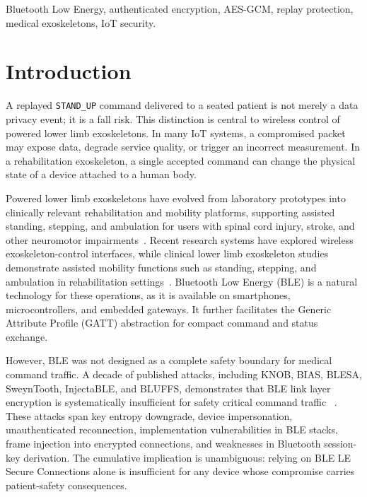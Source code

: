 \documentclass[journal]{IEEEtran}
\begin{document}
\begin{IEEEkeywords}
Bluetooth Low Energy, authenticated encryption, AES-GCM, replay protection,
medical exoskeletons, IoT security.
\end{IEEEkeywords}

\IEEEpeerreviewmaketitle


\section{Introduction}
\label{sec:intro}

A replayed \texttt{STAND\_UP} command delivered to a seated patient is not merely a data privacy event; it is a fall risk. This distinction is central to wireless control of powered lower limb exoskeletons. In many IoT systems, a compromised packet may expose data, degrade service quality, or trigger an incorrect measurement. In a rehabilitation exoskeleton, a single accepted command can change the physical state of a device attached to a human body.

Powered lower limb exoskeletons have evolved from laboratory prototypes into clinically relevant rehabilitation and mobility platforms, supporting assisted standing, stepping, and ambulation for users with spinal cord injury, stroke, and other neuromotor impairments~\cite{baud2021review,pinto2020performance}.
Recent research systems have explored wireless exoskeleton-control interfaces, while clinical lower limb exoskeleton studies demonstrate assisted mobility functions such as standing, stepping, and ambulation in rehabilitation settings~\cite{andersson2024wireless,atlas2030_2022}.
Bluetooth Low Energy (BLE) is a natural technology for these operations, as it is available on smartphones, microcontrollers, and embedded gateways. It further facilitates the Generic Attribute Profile (GATT) abstraction for compact command and status exchange.

However, BLE was not designed as a complete safety boundary for medical command traffic. A decade of published attacks, including KNOB, BIAS, BLESA, SweynTooth, InjectaBLE, and BLUFFS, demonstrates that BLE link layer encryption is systematically insufficient for safety critical command traffic
~\cite{antonioli2020knob,antonioli2020bias,wu2020blesa,garbelini2020sweyntooth,
cayre2021injectable,antonioli2023bluffs}. 
These attacks span key entropy downgrade, device impersonation, unauthenticated reconnection, implementation vulnerabilities in BLE stacks, frame injection into encrypted connections, and weaknesses in Bluetooth session-key derivation. The cumulative implication is unambiguous: relying on BLE LE Secure Connections alone is insufficient for any device whose compromise carries patient-safety consequences.
\end{document}
